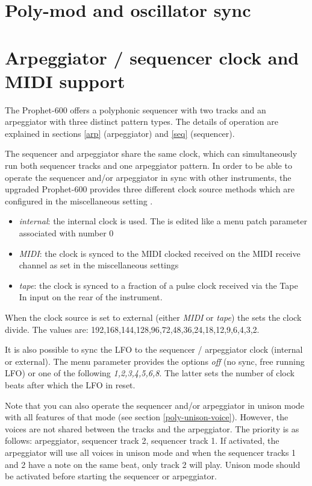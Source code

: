 \documentclass[landscape, 11pt, oneside, twoside]{report}
\newenvironment{flowtext}{\addmargin[0cm]{0cm}}{\endaddmargin} %
\begin{document}
\begin{flowtext}


\section{Poly-mod and oscillator sync}\label{polymod}



\pagebreak

\section{Arpeggiator / sequencer clock and MIDI support}\label{sync}

The Prophet-600 offers a polyphonic sequencer with two tracks and an arpeggiator with three distinct pattern types. The details of operation are explained in sections \ref{arp} (arpeggiator) and \ref{seq} (sequencer).

The sequencer and arpeggiator share the same clock, which can simultaneously run both sequencer tracks and one arpeggiator pattern. In order to be able to operate the sequencer and/or arpeggiator in sync with other instruments, the upgraded Prophet-600 provides three different clock source methods which are configured in the miscellaneous setting \clocksync.
\begin{itemize}
  \item \textit{internal}: the internal clock is used. The \clock is edited like a menu patch parameter associated with number 0
  \item \textit{MIDI}: the clock is synced to the MIDI clocked received on the MIDI receive channel as set in the  miscellaneous settings
  \item \textit{tape}: the clock is synced to a fraction of a pulse clock received via the Tape In input on the rear of the instrument. 
\end{itemize}  
When the clock source is set to external (either \textit{MIDI} or \textit{tape}) the \clock sets the clock divide. The values are: 192,168,144,128,96,72,48,36,24,18,12,9,6,4,3,2.

It is also possible to sync the LFO to the sequencer / arpeggiator clock (internal or external). The menu parameter \lfosync provides the options \textit{off} (no sync, free running LFO) or one of the following \textit{1,2,3,4,5,6,8}. The latter sets the number of clock beats after which the LFO in reset.

Note that you can also operate the sequencer and/or arpeggiator in unison mode with all features of that mode (see section \ref{poly-unison-voice}). However, the voices are not shared between the tracks and the arpeggiator. The priority is as follows: arpeggiator, sequencer track 2, sequencer track 1. If activated, the arpeggiator will use all voices in unison mode and when the sequencer tracks 1 and 2 have a note on the same beat, only track 2 will play. Unison mode should be activated before starting the sequencer or arpeggiator.


\end{flowtext}
\end{document}
